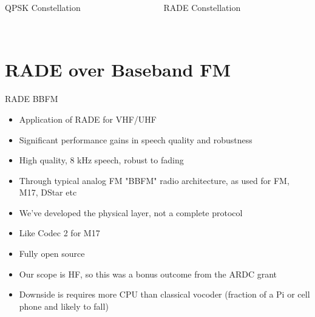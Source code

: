 \documentclass{beamer}
\begin{document}
\begin{frame}

\begin{columns}
\begin{column}{0.5\textwidth}
  \begin{center}
  QPSK Constellation \\~\\
  \end{center}
\end{column}
\begin{column}{0.5\textwidth}  %
  \begin{center}
  RADE Constellation \\~\\
  \end{center}
\end{column}
\end{columns}

\end{frame}

\section{RADE over Baseband FM}
\begin{frame}{RADE BBFM}
\begin{itemize}
\item Application of RADE for VHF/UHF
\item Significant performance gains in speech quality and robustness
\item High quality, 8 kHz speech, robust to fading
\item Through typical analog FM "BBFM" radio architecture, as used for FM, M17, DStar etc
\item We've developed the physical layer, not a complete protocol
\item Like Codec 2 for M17
\item Fully open source
\item Our scope is HF, so this was a bonus outcome from the ARDC grant
\item Downside is requires more CPU than classical vocoder (fraction of a Pi or cell phone and likely to fall)
\end{itemize}
\end{frame}
\end{document}
